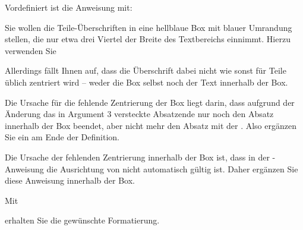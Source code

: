 Vordefiniert ist die Anweisung mit:
\begin{lstcode}
  \newcommand{\partlineswithprefixformat}[3]{#2#3}
\end{lstcode}
%

\begin{Example}
  Sie wollen die Teile-Überschriften in eine hellblaue Box mit blauer
  Umrandung stellen, die nur etwa drei Viertel der Breite des Textbereichs
  einnimmt. Hierzu verwenden Sie
  Allerdings fällt Ihnen auf, dass die Überschrift dabei nicht wie sonst
  für Teile üblich zentriert wird -- weder die Box selbst noch der Text
  innerhalb der Box.

  Die Ursache für die fehlende Zentrierung der Box liegt
  darin, dass aufgrund der Änderung das in Argument 3 versteckte Absatzende
  nur noch den Absatz innerhalb der Box beendet, aber nicht mehr den Absatz mit
  der . Also ergänzen Sie ein  am Ende der Definition.

  Die Ursache der fehlenden Zentrierung innerhalb der Box ist, dass in der
  -Anweisung die Ausrichtung von
   nicht automatisch gültig ist. Daher
  ergänzen Sie diese Anweisung innerhalb der Box.

  Mit
  erhalten Sie die gewünschte Formatierung.
\end{Example}

